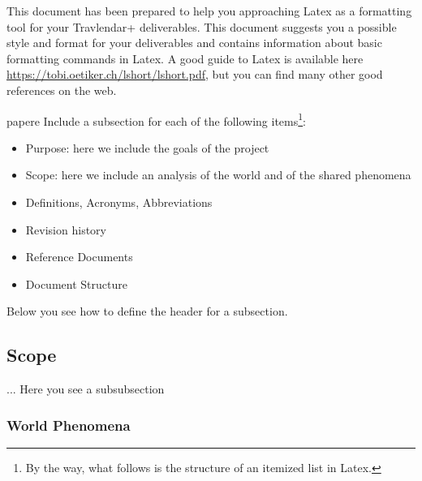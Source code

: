This document has been prepared to help you approaching Latex as a formatting tool for your Travlendar+ deliverables. This document suggests you a possible style and format for your deliverables and contains information about basic formatting commands in Latex. A good guide to Latex is available here \href{https://tobi.oetiker.ch/lshort/lshort.pdf}{https://tobi.oetiker.ch/lshort/lshort.pdf}, but you can find many other good references on the web. 

papere
Include a subsection for each of the following items\footnote{By the way, what follows is the structure of an itemized list in Latex.}:
\begin{itemize}
\item
Purpose: here we include the goals of the project
\item
Scope: here we include an analysis of the world and of the shared phenomena
\item
Definitions, Acronyms, Abbreviations
\item
Revision history
\item
Reference Documents 
\item
Document Structure
\end{itemize}
Below you see how to define the header for a subsection.
\subsection{Scope}
... Here you see a subsubsection
\subsubsection{World Phenomena}
